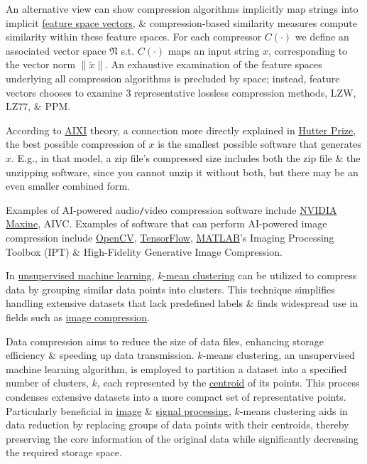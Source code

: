 \documentclass{article}
\begin{document}
An alternative view can show compression algorithms implicitly map strings into implicit \href{https://en.wikipedia.org/wiki/Feature_space_vector}{feature space vectors}, \& compression-based similarity measures compute similarity within these feature spaces. For each compressor $C(\cdot)$ we define an associated vector space $\mathfrak{N}$ s.t. $C(\cdot)$ maps an input string $x$, corresponding to the vector norm $\|\widetilde{x}\|$. An exhaustive examination of the feature spaces underlying all compression algorithms is precluded by space; instead, feature vectors chooses to examine 3 representative lossless compression methods, LZW, LZ77, \& PPM.

According to \href{https://en.wikipedia.org/wiki/AIXI}{AIXI} theory, a connection more directly explained in \href{https://en.wikipedia.org/wiki/Hutter_Prize}{Hutter Prize}, the best possible compression of $x$ is the smallest possible software that generates $x$. E.g., in that model, a zip file's compressed size includes both the zip file \& the unzipping software, since you cannot unzip it without both, but there may be an even smaller combined form.

Examples of AI-powered audio{\tt/}video compression software include \href{https://en.wikipedia.org/wiki/NVIDIA_Maxine}{NVIDIA Maxine}, AIVC. Examples of software that can perform AI-powered image compression include \href{https://en.wikipedia.org/wiki/OpenCV}{OpenCV}, \href{https://en.wikipedia.org/wiki/TensorFlow}{TensorFlow}, \href{https://en.wikipedia.org/wiki/MATLAB}{MATLAB}'s Imaging Processing Toolbox (IPT) \& High-Fidelity Generative Image Compression.

In \href{https://en.wikipedia.org/wiki/Unsupervised_machine_learning}{unsupervised machine learning}, \href{https://en.wikipedia.org/wiki/K-means_clustering}{$k$-mean clustering} can be utilized to compress data by grouping similar data points into clusters. This technique simplifies handling extensive datasets that lack predefined labels \& finds widespread use in fields such as \href{https://en.wikipedia.org/wiki/Image_compression}{image compression}.

Data compression aims to reduce the size of data files, enhancing storage efficiency \& speeding up data transmission. $k$-means clustering, an unsupervised machine learning algorithm, is employed to partition a dataset into a specified number of clusters, $k$, each represented by the \href{https://en.wikipedia.org/wiki/Centroid}{centroid} of its points. This process condenses extensive datasets into a more compact set of representative points. Particularly beneficial in \href{https://en.wikipedia.org/wiki/Image_processing}{image} \& \href{https://en.wikipedia.org/wiki/Signal_processing}{signal processing}, $k$-means clustering aids in data reduction by replacing groups of data points with their centroids, thereby preserving the core information of the original data while significantly decreasing the required storage space.
\end{document}
